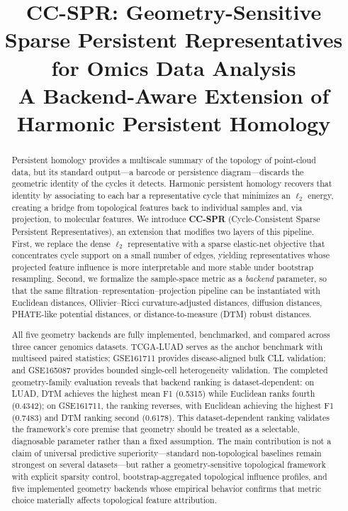 \documentclass[11pt]{article}
\title{CC-SPR: Geometry-Sensitive Sparse Persistent Representatives\\for Omics Data Analysis\\[6pt]
\large A Backend-Aware Extension of Harmonic Persistent Homology}
\author{}
\date{}
\begin{document}
\maketitle

\begin{abstract}
Persistent homology provides a multiscale summary of the topology of point-cloud data, but its standard output---a barcode or persistence diagram---discards the geometric identity of the cycles it detects.
Harmonic persistent homology recovers that identity by associating to each bar a representative cycle that minimizes an $\ell_2$ energy, creating a bridge from topological features back to individual samples and, via projection, to molecular features.
We introduce \textbf{CC-SPR} (Cycle-Consistent Sparse Persistent Representatives), an extension that modifies two layers of this pipeline.
First, we replace the dense $\ell_2$ representative with a sparse elastic-net objective that concentrates cycle support on a small number of edges, yielding representatives whose projected feature influence is more interpretable and more stable under bootstrap resampling.
Second, we formalize the sample-space metric as a \emph{backend} parameter, so that the same filtration--representation--projection pipeline can be instantiated with Euclidean distances, Ollivier--Ricci curvature-adjusted distances, diffusion distances, PHATE-like potential distances, or distance-to-measure (DTM) robust distances.

All five geometry backends are fully implemented, benchmarked, and compared across three cancer genomics datasets.
TCGA-LUAD serves as the anchor benchmark with multiseed paired statistics; GSE161711 provides disease-aligned bulk CLL validation; and GSE165087 provides bounded single-cell heterogeneity validation.
The completed geometry-family evaluation reveals that backend ranking is dataset-dependent: on LUAD, DTM achieves the highest mean F1 (0.5315) while Euclidean ranks fourth (0.4342); on GSE161711, the ranking reverses, with Euclidean achieving the highest F1 (0.7483) and DTM ranking second (0.6178).
This dataset-dependent ranking validates the framework's core premise that geometry should be treated as a selectable, diagnosable parameter rather than a fixed assumption.
The main contribution is not a claim of universal predictive superiority---standard non-topological baselines remain strongest on several datasets---but rather a geometry-sensitive topological framework with explicit sparsity control, bootstrap-aggregated topological influence profiles, and five implemented geometry backends whose empirical behavior confirms that metric choice materially affects topological feature attribution.
\end{abstract}
\end{document}
